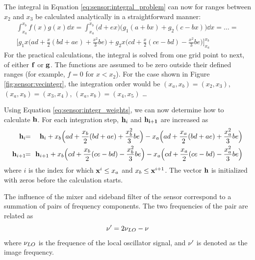  The integral in Equation \ref{eq:sensor:integral_problem} can now for
 ranges between $x_2$ and $x_3$ be calculated analytically in a
 straightforward manner:
 \begin{eqnarray}
    \int_{x_a}^{x_b}{f(x)g(x) \dd x} =
    \int_{x_a}^{x_b}{\big(d+ex\big)\big(g_1(a+bx)+g_2(c-bx)\big) \dd x}  
    =\dots= \nonumber\\
    \bigg[ g_1x\Big(ad+\frac{x}{2}(bd+ae)+\frac{x^2}{3}be\Big) + 
           g_2x\Big(cd+\frac{x}{2}(ce-bd)-\frac{x^2}{3}be \Big)
           \bigg]_{x_a}^{x_b}
    \label{eq:sensor:integr_weights}
 \end{eqnarray}
 For the practical calculations, the integral is solved from one grid
 point to next, of either $\mathbf{f}$ or $\mathbf{g}$. The functions are 
 assumed to be zero outside their defined ranges (for example, $f=0$ 
 for $x<x_2$).
 For the case
 shown in Figure \ref{fig:sensor:vecintegr}, the integration order would be
 $(x_a,x_b)=(x_2,x_3)$, $(x_a,x_b)=(x_3,x_4)$, $(x_a,x_b)=(x_4,x_5)$
 \ldots\
  
 Using Equation \ref{eq:sensor:integr_weights}, we can now determine how to
 calculate $\mathbf{h}$. For each integration step, $\mathbf{h}_i$ and
 $\mathbf{h_{i+1}}$ are increased as
 \begin{eqnarray}
    \mat{h}_i \!\! &=& \!\! \mat{h}_i +    
              x_b\Big(ad+\frac{x_b}{2}(bd+ae)+\frac{x_b^2}{3}be\Big) - 
              x_a\Big(ad+\frac{x_a}{2}(bd+ae)+\frac{x_a^2}{3}be\Big) 
    \nonumber \\
    \mat{h}_{i+1} \!\! &=& \!\! \mat{h}_{i+1} +
              x_b\Big(cd+\frac{x_b}{2}(ce-bd)-\frac{x_b^2}{3}be\Big) - 
              x_a\Big(cd+\frac{x_a}{2}(ce-bd)-\frac{x_a^2}{3}be\Big) 
    \nonumber
 \end{eqnarray}
 where $i$ is the index for which $\mathbf{x}^i \leq x_a$ and $x_b \leq
 \mathbf{x}^{i+1}$. The vector $\mathbf{h}$ is initialized with
 zeros before the calculation starts.



  
 The influence of the mixer and sideband filter of the sensor
 correspond to a summation of pairs of frequency components. The two
 frequencies of the pair are related as
 \begin{equation}
    \nu' = 2\nu_{LO}-\nu
 \end{equation}
 where $\nu_{LO}$ is the frequence of the local oscillator signal, and
 $\nu'$ is denoted as the image frequency.

